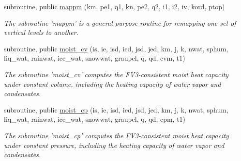 \begin{DoxyCompactItemize}
subroutine, public \hyperlink{classfv__mapz__mod_ab8ee4094f27d3aa103d9101c1a46a5cd}{mappm} (km, pe1, q1, kn, pe2, q2, i1, i2, iv, kord, ptop)
\begin{DoxyCompactList}\small\item\em The subroutine 'mappm' is a general-\/purpose routine for remapping one set of vertical levels to another. \end{DoxyCompactList}\item 
subroutine, public \hyperlink{classfv__mapz__mod_a7e2f210d41b616b0d7fb31e6f624897c}{moist\-\_\-cv} (is, ie, isd, ied, jsd, jed, km, j, k, nwat, sphum, liq\-\_\-wat, rainwat, ice\-\_\-wat, snowwat, graupel, q, qd, cvm, t1)
\begin{DoxyCompactList}\small\item\em The subroutine 'moist\-\_\-cv' computes the F\-V3-\/consistent moist heat capacity under constant volume, including the heating capacity of water vapor and condensates. \end{DoxyCompactList}\item 
subroutine, public \hyperlink{classfv__mapz__mod_ae179a4a6af972dd3480b55f62c1ce72e}{moist\-\_\-cp} (is, ie, isd, ied, jsd, jed, km, j, k, nwat, sphum, liq\-\_\-wat, rainwat, ice\-\_\-wat, snowwat, graupel, q, qd, cpm, t1)
\begin{DoxyCompactList}\small\item\em The subroutine 'moist\-\_\-cp' computes the F\-V3-\/consistent moist heat capacity under constant pressure, including the heating capacity of water vapor and condensates. \end{DoxyCompactList}\end{DoxyCompactItemize}
